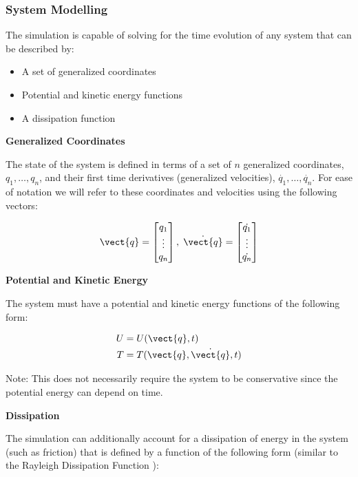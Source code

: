 \subsubsection{System Modelling}

The simulation is capable of solving for the time evolution of any system that can be described by:

\begin{itemize}
    \item A set of generalized coordinates
    \item Potential and kinetic energy functions
    \item A dissipation function
\end{itemize}

\textbf{Generalized Coordinates}

The state of the system is defined in terms of a set of $n$ generalized coordinates, $q_1, \dots, q_n$, and their first time derivatives (generalized velocities), $\Dot{q_1}, \dots, \Dot{q_n}$. For ease of notation we will refer to these coordinates and velocities using the following vectors:

\[
    \vect{q} = \begin{bmatrix}q_1 \\ \vdots \\q_n \end{bmatrix}
    ,\;
    \Dot{\vect{q}} = \begin{bmatrix}\Dot{q_1} \\ \vdots \\\Dot{q_n} \end{bmatrix}
\]

\textbf{Potential and Kinetic Energy}

The system must have a potential and kinetic energy functions of the following form:

\begin{align*}
    U &= U(\vect{q}, t)\\
    T &= T(\vect{q}, \Dot{\vect{q}}, t)
\end{align*}

Note: This does not necessarily require the system to be conservative since the potential energy can depend on time.

\textbf{Dissipation}

The simulation can additionally account for a dissipation of energy in the system (such as friction) that is defined by a function of the following form (similar to the Rayleigh Dissipation Function \cite{rayleigh}):


